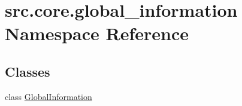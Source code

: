 \hypertarget{namespacesrc_1_1core_1_1global__information}{\section{src.\+core.\+global\+\_\+information Namespace Reference}
\label{namespacesrc_1_1core_1_1global__information}
}
\subsection*{Classes}
\begin{DoxyCompactItemize}
\item 
class \hyperlink{classsrc_1_1core_1_1global__information_1_1_global_information}{Global\+Information}
\end{DoxyCompactItemize}
